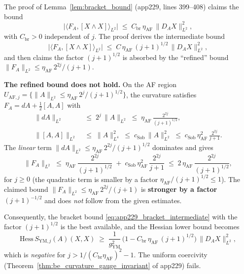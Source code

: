 \begin{theorem}
\label{thm:app229_error1}
The proof of Lemma~\ref{lem:bracket_bound} (app229, lines 399--408)
claims the bound
\begin{equation*}
  \bigl|\langle F_{A},[X\wedge X]\rangle_{L^{2}}\bigr|
  \;\le\;C_{\mathrm{br}}\,\eta_{\mathrm{AF}}\,
  \|D_{A}X\|_{L^{2}}^{2},
\end{equation*}
with $C_{\mathrm{br}}>0$ independent of $j$. The proof derives
the intermediate bound
\begin{equation}
\label{eq:app229_bracket_intermediate}
  \bigl|\langle F_{A},[X\wedge X]\rangle_{L^{2}}\bigr|
  \;\le\;C\,\eta_{\mathrm{AF}}\,(j+1)^{1/2}\,
  \|D_{A}X\|_{L^{2}}^{2},
\end{equation}
and then claims the factor $(j+1)^{1/2}$ is absorbed by the
``refined'' bound $\|F_{A}\|_{L^{2}}\le
\eta_{\mathrm{AF}}\,2^{2j}/(j+1)$.

\textbf{The refined bound does not hold.} On the AF region
$U_{\mathrm{AF},j}=\{\|A\|_{L^{2}}\le\eta_{\mathrm{AF}}\,
2^{j}/(j+1)^{1/2}\}$, the curvature satisfies
$F_{A}=dA+\tfrac{1}{2}[A,A]$ with
\begin{align*}
  \|dA\|_{L^{2}}
  &\;\le\;2^{j}\,\|A\|_{L^{2}}
  \;\le\;\eta_{\mathrm{AF}}\,\frac{2^{2j}}{(j+1)^{1/2}},\\
  \|[A,A]\|_{L^{2}}
  &\;\le\;\|A\|_{L^{4}}^{2}
  \;\le\;c_{\mathrm{Sob}}\,\|A\|_{L^{2}}^{2}
  \;\le\;c_{\mathrm{Sob}}\,\eta_{\mathrm{AF}}^{2}\,
  \frac{2^{2j}}{j+1}.
\end{align*}
The \emph{linear} term $\|dA\|_{L^{2}}\le
\eta_{\mathrm{AF}}\,2^{2j}/(j+1)^{1/2}$ dominates and gives
\begin{equation}
\label{eq:fa_bound_correct}
  \|F_{A}\|_{L^{2}}
  \;\le\;\eta_{\mathrm{AF}}\,\frac{2^{2j}}{(j+1)^{1/2}}
  \;+\;c_{\mathrm{Sob}}\,\eta_{\mathrm{AF}}^{2}\,
  \frac{2^{2j}}{j+1}
  \;\le\;2\,\eta_{\mathrm{AF}}\,\frac{2^{2j}}{(j+1)^{1/2}},
\end{equation}
for $j\ge 0$ (the quadratic term is smaller by a factor
$\eta_{\mathrm{AF}}/(j+1)^{1/2}\le 1$). The claimed bound
$\|F_{A}\|_{L^{2}}\le\eta_{\mathrm{AF}}\,2^{2j}/(j+1)$ is
\textbf{stronger by a factor $(j+1)^{-1/2}$} and does \emph{not}
follow from the given estimates.

Consequently, the bracket bound
\eqref{eq:app229_bracket_intermediate} with the factor
$(j+1)^{1/2}$ is the best available, and the Hessian lower bound
becomes
\begin{equation}
\label{eq:hessian_lower_app229_correct}
  \mathrm{Hess}\,S_{\mathrm{YM},j}(A)(X,X)
  \;\ge\;\frac{1}{g_{\mathrm{YM}}^{2}}\,
  \bigl(1-C_{\mathrm{br}}\,\eta_{\mathrm{AF}}\,(j+1)^{1/2}\bigr)\,
  \|D_{A}X\|_{L^{2}}^{2},
\end{equation}
which is \emph{negative} for $j>1/(C_{\mathrm{br}}\eta_{
\mathrm{AF}})^{2}-1$. The uniform coercivity
(Theorem~\ref{thm:be_curvature_gauge_invariant} of app229) fails.
\end{theorem}

